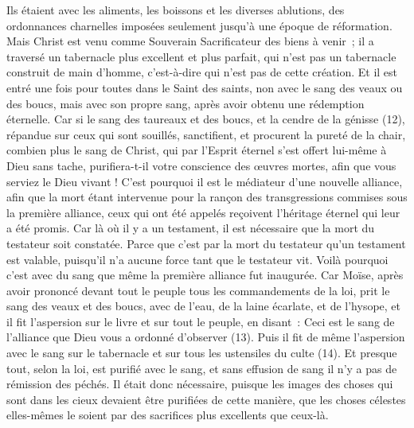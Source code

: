 \begin{multicols}{2}
Ils étaient avec les aliments, les boissons et les diverses ablutions, des ordonnances charnelles imposées seulement jusqu’à une époque de réformation.
Mais Christ est venu comme Souverain Sacrificateur des biens à venir ; il a traversé un tabernacle plus excellent et plus parfait, qui n'est pas un tabernacle construit de main d’homme, c'est-à-dire qui n’est pas de cette création.
Et il est entré une fois pour toutes dans le Saint des saints, non avec le sang des veaux ou des boucs, mais avec son propre sang, après avoir obtenu une rédemption éternelle.
Car si le sang des taureaux et des boucs, et la cendre de la génisse (12), répandue sur ceux qui sont souillés, sanctifient, et procurent la pureté de la chair,
combien plus le sang de Christ, qui par l'Esprit éternel s'est offert lui-même à Dieu sans tache, purifiera-t-il votre conscience des œuvres mortes, afin que vous serviez le Dieu vivant !
C'est pourquoi il est le médiateur d’une nouvelle alliance, afin que la mort étant intervenue pour la rançon des transgressions commises sous la première alliance, ceux qui ont été appelés reçoivent l’héritage éternel qui leur a été promis.
Car là où il y a un testament, il est nécessaire que la mort du testateur soit constatée.
Parce que c'est par la mort du testateur qu'un testament est valable, puisqu’il n'a aucune force tant que le testateur vit.
Voilà pourquoi c’est avec du sang que même la première alliance fut inaugurée.
Car Moïse, après avoir prononcé devant tout le peuple tous les commandements de la loi, prit le sang des veaux et des boucs, avec de l'eau, de la laine écarlate, et de l'hysope, et il fit l’aspersion sur le livre et sur tout le peuple, en disant :
Ceci est le sang de l’alliance que Dieu vous a ordonné d'observer (13).
Puis il fit de même l’aspersion avec le sang sur le tabernacle et sur tous les ustensiles du culte (14).
Et presque tout, selon la loi, est purifié avec le sang, et sans effusion de sang il n’y a pas de rémission des péchés.
Il était donc nécessaire, puisque les images des choses qui sont dans les cieux devaient être purifiées de cette manière, que les choses célestes elles-mêmes le soient par des sacrifices plus excellents que ceux-là.

\end{multicols}
